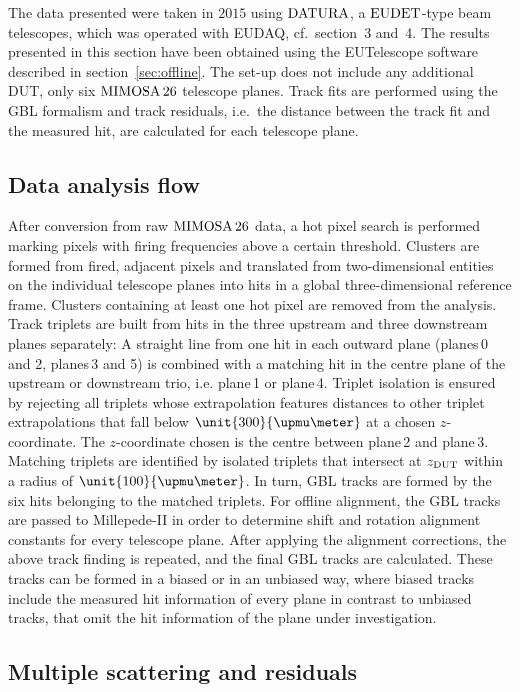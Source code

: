 
The data presented were taken in $2015$ using $\textrm{DATURA}$, a $\textrm{EUDET}$-type beam telescopes, which was operated with EUDAQ, cf.~section~3 and~4. 
The results presented in this section have been obtained using the EUTelescope software described in section~\ref{sec:offline}.
The set-up does not include any additional DUT, only six $\textrm{MIMOSA\,26}$ telescope planes. 
Track fits are performed using the GBL formalism and track residuals, i.e.\ the distance between the track fit and the measured hit,
 are calculated for each telescope plane. 
 

\subsection{Data analysis flow}
\label{sec:datura-nodut}

After conversion from raw $\textrm{MIMOSA\,26}$ data, a hot pixel search is performed marking pixels with firing frequencies above a certain threshold.
Clusters are formed from fired, adjacent pixels and translated from two-dimensional entities on the individual telescope planes into hits in a global three-dimensional reference frame.
Clusters containing at least one hot pixel are removed from the analysis. 
Track triplets are built from hits in the three upstream and three downstream planes separately: 
A straight line from one hit in each outward plane (planes\,0 and 2, planes\,3 and 5) is combined with a matching hit in the centre plane of the upstream or downstream trio, i.e. plane\,1 or plane\,4. 
Triplet isolation is ensured by rejecting all triplets whose extrapolation features distances to other triplet extrapolations that fall below $\unit{300}{\upmu\meter}$ at a chosen $z$-coordinate.
The $z$-coordinate chosen is the centre between plane\,2 and plane\,3. 
Matching triplets are identified by isolated triplets that intersect at $z_{\textrm{DUT}}$ within a radius of $\unit{100}{\upmu\meter}$. 
In turn, GBL tracks are formed by the six hits belonging to the matched triplets. 
For offline alignment, the GBL tracks are passed to Millepede-II in order to determine shift and rotation alignment constants for every telescope plane.
After applying the alignment corrections, the above track finding is repeated, and the final GBL tracks are calculated. 
These tracks can be formed in a \textrm{biased} or in an \textrm{unbiased} way, where biased tracks include the measured hit information of every plane in contrast to unbiased tracks,
 that omit the hit information of the plane under investigation. 

\subsection{Multiple scattering and residuals}
\label{sec:resmultiple}

